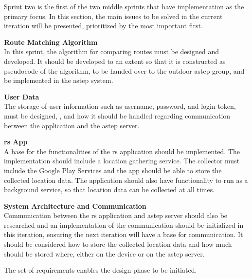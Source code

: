 Sprint two is the first of the two middle sprints that have implementation as the primary focus. In this section, the main issues to be solved in the current iteration will be presented, prioritized by the most important first.

\textbf{Route Matching Algorithm}\\
In this sprint, the algorithm for comparing routes must be designed and developed. 
It should be developed to an extent so that it is constructed as pseudocode of the algorithm, to be handed over to the outdoor \gls{astep} group, and be implemented in the \gls{astep} system.

\textbf{User Data}\\
The storage of user information such as username, password, and login token, must be designed, , and how it should be handled regarding communication between the application and the \gls{astep} server.

\textbf{\gls{rs} App}\\
A base for the functionalities of the \gls{rs} application should be implemented. 
The implementation should include a location gathering service.
The collector must include the Google Play Services and the app should be able to store the collected location data. 
The application should also have functionality to run as a background service, so that location data can be collected at all times.

\textbf{System Architecture and Communication}\\
Communication between the \gls{rs} application and \gls{astep} server should also be researched and an implementation of the communication should be initialized in this iteration, ensuring the next iteration will have a base for communication. 
It should be considered how to store the collected location data and how much should be stored where, either on the device or on the \gls{astep} server.


The set of requirements enables the design phase to be initiated.